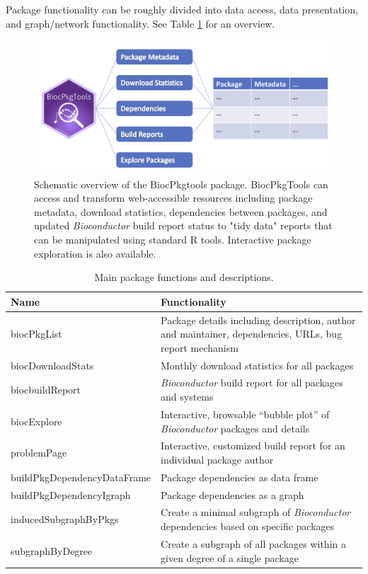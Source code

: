 \documentclass[9pt,a4paper]{extarticle}\usepackage[]{graphicx}\usepackage[]{color}
\begin{document}
Package functionality can be roughly divided into data access, data
presentation, and graph/network functionality. See Table
\ref{tab:functions} for an overview.

\begin{figure}
  \caption{Schematic overview of the BiocPkgtools package. BiocPkgTools can access and transform web-accessible resources including package metadata, download statistics, dependencies between packages, and updated \emph{Bioconductor} build report status to "tidy data" reports that can be manipulated using standard R tools. Interactive package exploration is also available.}
  \label{fig:overview}
  \includegraphics[width=1.0\textwidth]{BiocPkgToolsFig1mock.png}
\end{figure}


\begin{table}[h]
  \caption{Main package functions and descriptions.}
  \label{tab:functions}
  \begin{tabularx}{\linewidth}{ l X }
    \hline
    Name & Functionality \\
    \hline
    biocPkgList & Package details including description, author and maintainer, dependencies, URLs, bug report mechanism \\
    biocDownloadStats & Monthly download statistics for all packages \\
    biocbuildReport & \emph{Bioconductor} build report for all packages and systems \\
    biocExplore & Interactive, browsable ``bubble plot'' of \emph{Bioconductor} packages and details \\
    problemPage & Interactive, customized build report for an individual package author \\
    buildPkgDependencyDataFrame & Package dependencies as data frame \\
    buildPkgDependencyIgraph & Package dependencies as a graph \citep{igraph} \\
    inducedSubgraphByPkgs & Create a minimal subgraph of \emph{Bioconductor} dependencies based on specific packages \\
    subgraphByDegree & Create a subgraph of all packages within a given degree of a single package \\
    \hline
  \end{tabularx}
\end{table}
\end{document}
